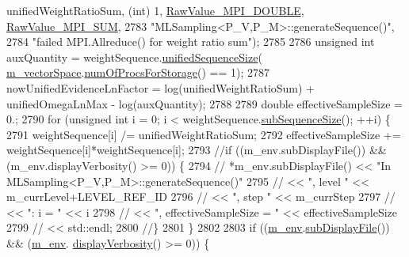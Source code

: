 \begin{DoxyCode}
      unifiedWeightRatioSum, (\textcolor{keywordtype}{int}) 1, \hyperlink{_mpi_comm_8h_ad0f503bd9fecfe4e570ca3d15aaf2518}{RawValue\_MPI\_DOUBLE}, \hyperlink{_mpi_comm_8h_afbf78d291c032aa7f512bc566cee2bd1}{RawValue\_MPI\_SUM},
2783                                      \textcolor{stringliteral}{"MLSampling<P\_V,P\_M>::generateSequence()"},
2784                                      \textcolor{stringliteral}{"failed MPI.Allreduce() for weight ratio sum"});
2785 
2786         \textcolor{keywordtype}{unsigned} \textcolor{keywordtype}{int} auxQuantity = weightSequence.\hyperlink{class_q_u_e_s_o_1_1_scalar_sequence_a52829afc95e5c36e9db44f40854153b0}{unifiedSequenceSize}(
      \hyperlink{class_q_u_e_s_o_1_1_m_l_sampling_a7bc4c72f65ba9166ed94a6e198b0915b}{m\_vectorSpace}.\hyperlink{class_q_u_e_s_o_1_1_vector_space_a67b0c3620662116f5a346fdaa5faf38e}{numOfProcsForStorage}() == 1);
2787         nowUnifiedEvidenceLnFactor = log(unifiedWeightRatioSum) + unifiedOmegaLnMax - log(auxQuantity);
2788 
2789         \textcolor{keywordtype}{double} effectiveSampleSize = 0.;
2790         \textcolor{keywordflow}{for} (\textcolor{keywordtype}{unsigned} \textcolor{keywordtype}{int} i = 0; i < weightSequence.\hyperlink{class_q_u_e_s_o_1_1_scalar_sequence_a0288ea295eedc216a1617b3286f6f3a0}{subSequenceSize}(); ++i) \{
2791           weightSequence[i] /= unifiedWeightRatioSum;
2792           effectiveSampleSize += weightSequence[i]*weightSequence[i];
2793           \textcolor{comment}{//if ((m\_env.subDisplayFile()) && (m\_env.displayVerbosity() >= 0)) \{}
2794           \textcolor{comment}{//  *m\_env.subDisplayFile() << "In MLSampling<P\_V,P\_M>::generateSequence()"}
2795           \textcolor{comment}{//                          << ", level "                 << m\_currLevel+LEVEL\_REF\_ID}
2796           \textcolor{comment}{//                          << ", step "                  << m\_currStep}
2797           \textcolor{comment}{//                          << ": i = "                   << i}
2798           \textcolor{comment}{//                          << ", effectiveSampleSize = " << effectiveSampleSize}
2799           \textcolor{comment}{//                          << std::endl;}
2800           \textcolor{comment}{//\}}
2801         \}
2802 
2803         \textcolor{keywordflow}{if} ((\hyperlink{class_q_u_e_s_o_1_1_m_l_sampling_a13f1ca4fe9f94822fe572a743eaced1d}{m\_env}.\hyperlink{class_q_u_e_s_o_1_1_base_environment_a8a0064746ae8dddfece4229b9ad374d6}{subDisplayFile}()) && (\hyperlink{class_q_u_e_s_o_1_1_m_l_sampling_a13f1ca4fe9f94822fe572a743eaced1d}{m\_env}.
      \hyperlink{class_q_u_e_s_o_1_1_base_environment_a1fe5f244fc0316a0ab3e37463f108b96}{displayVerbosity}() >= 0)) \{

\end{DoxyCode}
